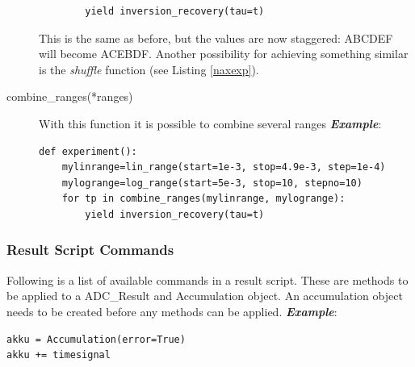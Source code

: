 \documentclass[12pt, a4paper, BCOR10mm, twoside, titlepage, headinclude]{scrbook}
\begin{document}
\begin{description}
\begin{lstlisting}
		yield inversion_recovery(tau=t)
\end{lstlisting}
This is the same as before, but the values are now staggered: ABCDEF will become ACEBDF. Another possibility for achieving something similar is the \emph{shuffle} function (see Listing \ref{naxexp}).
\item[combine\_ranges(*ranges)] With this function it is possible to combine several ranges 
\newline
\emph{\textbf{Example}}:
\begin{lstlisting}
def experiment():
	mylinrange=lin_range(start=1e-3, stop=4.9e-3, step=1e-4)
	mylogrange=log_range(start=5e-3, stop=10, stepno=10)
	for tp in combine_ranges(mylinrange, mylogrange):
		yield inversion_recovery(tau=t)
\end{lstlisting}


\end{description}

\subsubsection{Result Script Commands}
Following is a list of available commands in a result script. These are methods to be applied to a ADC\_Result and  Accumulation  object. An accumulation object needs to be created before any methods can be applied.
\newline
\emph{\textbf{Example}}:
\begin{lstlisting}
akku = Accumulation(error=True)
akku += timesignal
\end{lstlisting}
\end{document}
